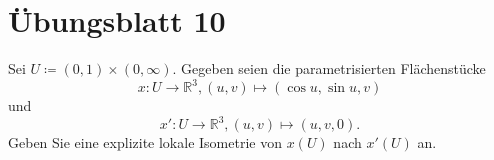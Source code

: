 %
\section{Übungsblatt 10}
\setcounter{problemcounter}{0}

\begin{assignment}
  Sei \( U \coloneqq (0,1) \times (0, \infty) \). Gegeben seien die parametrisierten Flächenstücke
  \begin{equation*}
    x : U \to \mathbb{R}^3, (u,v) \mapsto (\cos u, \sin u, v)
  \end{equation*} 
  und 
  \begin{equation*}
    x' : U \to \mathbb{R}^3, (u,v) \mapsto (u,v,0).
  \end{equation*}
  Geben Sie eine explizite lokale Isometrie von \( x(U) \) nach \( x'(U) \) an.
\end{assignment}
